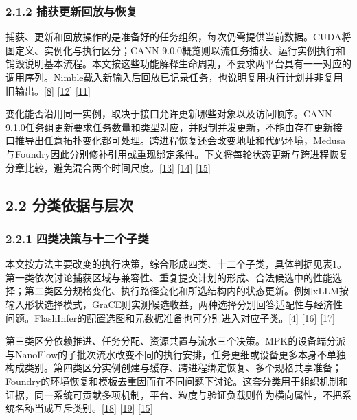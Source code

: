 \documentclass[
  11pt,
  UTF8]{ctexart}
\begin{document}
\hypertarget{section-2-1-2}{%
\subsubsection{2.1.2 捕获更新回放与恢复}\label{section-2-1-2}}

捕获、更新和回放操作的是准备好的任务组织，每次仍需提供当前数据。CUDA将图定义、实例化与执行区分；CANN
9.0.0概览则以流任务捕获、运行实例执行和销毁说明基本流程。本文按这些功能解释生命周期，不要求两平台具有一一对应的调用序列。Nimble载入新输入后回放已记录任务，也说明复用执行计划并非复用旧输出。{[}\protect\hyperlink{ref-nvidia2026cuda1303}{8}{]}
{[}\protect\hyperlink{ref-cann900overview}{12}{]}
{[}\protect\hyperlink{ref-kwon2020nimble}{11}{]}

变化能否沿用同一实例，取决于接口允许更新哪些对象以及访问顺序。CANN
9.1.0任务组更新要求任务数量和类型对应，并限制并发更新，不能由存在更新接口推导出任意拓扑变化都可处理。跨进程恢复还会改变地址和代码环境，Medusa与Foundry因此分别修补引用或重现绑定条件。下文将每轮状态更新与跨进程恢复分章比较，避免混合两个时间尺度。{[}\protect\hyperlink{ref-cann910update}{13}{]}
{[}\protect\hyperlink{ref-zeng2025medusa}{14}{]}
{[}\protect\hyperlink{ref-liu2026foundry}{15}{]}

\hypertarget{section-2-2}{%
\subsection{2.2 分类依据与层次}\label{section-2-2}}

\hypertarget{section-2-2-1}{%
\subsubsection{2.2.1 四类决策与十二个子类}\label{section-2-2-1}}

本文按方法主要改变的执行决策，综合形成四类、十二个子类，具体判据见表1。第一类依次讨论捕获区域与兼容性、重复提交计划的形成、合法候选中的性能选择；第二类区分规格变化、执行路径变化和所选结构内的状态更新。例如xLLM按输入形状选择模式，GraCE则实测候选收益，两种选择分别回答适配性与经济性问题。FlashInfer的配置选图和元数据准备也可分别进入对应子类。{[}\protect\hyperlink{ref-liu2025xllm}{4}{]}
{[}\protect\hyperlink{ref-ghosh2026grace}{16}{]}
{[}\protect\hyperlink{ref-ye2025flashinfer}{17}{]}

第三类区分依赖推进、任务分配、资源共置与流水三个决策。MPK的设备端分派与NanoFlow的子批次流水改变不同的执行安排，任务更细或设备更多本身不单独构成类别。第四类区分实例创建与缓存、跨进程绑定恢复、多个规格共享准备；Foundry的环境恢复和模板去重因而在不同问题下讨论。这套分类用于组织机制和证据，同一系统可贡献多项机制，平台、粒度与验证负载则作为横向属性，不把系统名称当成互斥类别。{[}\protect\hyperlink{ref-cheng2026mpk}{18}{]}
{[}\protect\hyperlink{ref-zhu2025nanoflow}{19}{]}
{[}\protect\hyperlink{ref-liu2026foundry}{15}{]}
\end{document}

